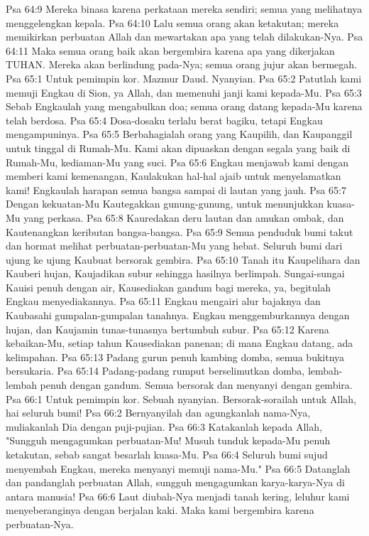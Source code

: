 Psa 64:9  Mereka binasa karena perkataan mereka sendiri; semua yang melihatnya menggelengkan kepala.
Psa 64:10  Lalu semua orang akan ketakutan; mereka memikirkan perbuatan Allah dan mewartakan apa yang telah dilakukan-Nya.
Psa 64:11  Maka semua orang baik akan bergembira karena apa yang dikerjakan TUHAN. Mereka akan berlindung pada-Nya; semua orang jujur akan bermegah.
Psa 65:1  Untuk pemimpin kor. Mazmur Daud. Nyanyian.
Psa 65:2  Patutlah kami memuji Engkau di Sion, ya Allah, dan memenuhi janji kami kepada-Mu.
Psa 65:3  Sebab Engkaulah yang mengabulkan doa; semua orang datang kepada-Mu karena telah berdosa.
Psa 65:4  Dosa-dosaku terlalu berat bagiku, tetapi Engkau mengampuninya.
Psa 65:5  Berbahagialah orang yang Kaupilih, dan Kaupanggil untuk tinggal di Rumah-Mu. Kami akan dipuaskan dengan segala yang baik di Rumah-Mu, kediaman-Mu yang suci.
Psa 65:6  Engkau menjawab kami dengan memberi kami kemenangan, Kaulakukan hal-hal ajaib untuk menyelamatkan kami! Engkaulah harapan semua bangsa sampai di lautan yang jauh.
Psa 65:7  Dengan kekuatan-Mu Kautegakkan gunung-gunung, untuk menunjukkan kuasa-Mu yang perkasa.
Psa 65:8  Kauredakan deru lautan dan amukan ombak, dan Kautenangkan keributan bangsa-bangsa.
Psa 65:9  Semua penduduk bumi takut dan hormat melihat perbuatan-perbuatan-Mu yang hebat. Seluruh bumi dari ujung ke ujung Kaubuat bersorak gembira.
Psa 65:10  Tanah itu Kaupelihara dan Kauberi hujan, Kaujadikan subur sehingga hasilnya berlimpah. Sungai-sungai Kauisi penuh dengan air, Kausediakan gandum bagi mereka, ya, begitulah Engkau menyediakannya.
Psa 65:11  Engkau mengairi alur bajaknya dan Kaubasahi gumpalan-gumpalan tanahnya. Engkau menggemburkannya dengan hujan, dan Kaujamin tunas-tunasnya bertumbuh subur.
Psa 65:12  Karena kebaikan-Mu, setiap tahun Kausediakan panenan; di mana Engkau datang, ada kelimpahan.
Psa 65:13  Padang gurun penuh kambing domba, semua bukitnya bersukaria.
Psa 65:14  Padang-padang rumput berselimutkan domba, lembah-lembah penuh dengan gandum. Semua bersorak dan menyanyi dengan gembira.
Psa 66:1  Untuk pemimpin kor. Sebuah nyanyian. Bersorak-sorailah untuk Allah, hai seluruh bumi!
Psa 66:2  Bernyanyilah dan agungkanlah nama-Nya, muliakanlah Dia dengan puji-pujian.
Psa 66:3  Katakanlah kepada Allah, "Sungguh mengagumkan perbuatan-Mu! Musuh tunduk kepada-Mu penuh ketakutan, sebab sangat besarlah kuasa-Mu.
Psa 66:4  Seluruh bumi sujud menyembah Engkau, mereka menyanyi memuji nama-Mu."
Psa 66:5  Datanglah dan pandanglah perbuatan Allah, sungguh mengagumkan karya-karya-Nya di antara manusia!
Psa 66:6  Laut diubah-Nya menjadi tanah kering, leluhur kami menyeberanginya dengan berjalan kaki. Maka kami bergembira karena perbuatan-Nya.
